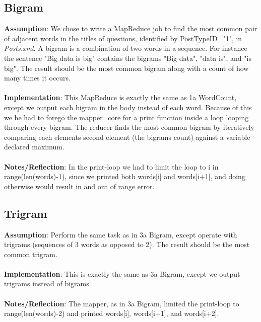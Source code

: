 \documentclass[fleqn,10pt]{wlscirep}
\begin{document}
\subsection{Bigram}
\textbf{Assumption}: We chose to write a MapReduce job to find the most common pair of adjacent words in the titles of questions, identified by PostTypeID="1", in \textit{Posts.xml}. A bigram is a combination of two words in a sequence. For instance the sentence "Big data is big" contains the bigrams "Big data", "data is", and "is big". The result should be the most common bigram along with a count of how many times it occurs. \\ \\
\textbf{Implementation}: This MapReduce is exactly the same as 1a WordCount, except we output each bigram in the body instead of each word. Because of this we he had to forego the mapper\_core for a print function inside a loop looping through every bigram. The reducer finds the most common bigram by iteratively comparing each elements second element (the bigrams count) against a variable declared maximum. \\ \\
\textbf{Notes/Reflection}: In the print-loop we had to limit the loop to i in range(len(words)-1), since we printed both words[i] and words[i+1], and doing otherwise would result in and out of range error.


\subsection{Trigram}
\textbf{Assumption}: Perform the same task as in 3a Bigram, except operate with trigrams (sequences of 3 words as opposed to 2). The result should be the most common trigram. \\ \\
\textbf{Implementation}: This is exactly the same as 3a Bigram, except we output trigrams instead of bigrams. \\ \\
\textbf{Notes/Reflection}: The mapper, as in 3a Bigram, limited the print-loop to range(len(words)-2) and printed words[i], words[i+1], and words[i+2].

\end{document}
